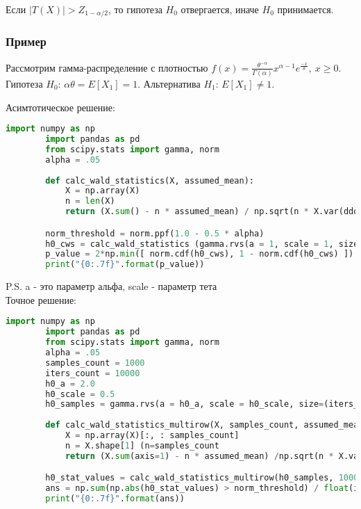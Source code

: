 Если $|T(X)| > Z_{1-\alpha/2}$, то гипотеза $H_0$ отвергается, иначе $H_0$ принимается.

\subsubsection*{Пример}\label{cha:1sample/sec:gamma/subsec:vald/subsubsec:python}

\begin{problem}
	 Рассмотрим гамма-распределение с плотностью $f(x) = \frac{\theta^{-\alpha}}{\Gamma(\alpha)} x^{\alpha-1} e^ {\frac{-x}{\theta}}, \ x \ge 0.$ Гипотеза $H_0$: $\alpha \theta = E[X_1] = 1$. Альтернатива $H_1$: $E[X_1] \neq 1$.
\end{problem}
\begin{solution}
	Асимтотическое решение:
	\begin{lstlisting}[language=Python]
		import numpy as np
		import pandas as pd
		from scipy.stats import gamma, norm
		alpha = .05
		
		def calc_wald_statistics(X, assumed_mean): 
	    	X = np.array(X)
	    	n = len(X)
	    	return (X.sum() - n * assumed_mean) / np.sqrt(n * X.var(ddof=1))

		norm_threshold = norm.ppf(1.0 - 0.5 * alpha)
		h0_cws = calc_wald_statistics (gamma.rvs(a = 1, scale = 1, size=2000), 1)
		p_value = 2*np.min([ norm.cdf(h0_cws), 1 - norm.cdf(h0_cws) ])
		print("{0:.7f}".format(p_value))
	\end{lstlisting}
	P.S. a - это параметр альфа, scale - параметр тета\\

	Точное решение:
	\begin{lstlisting}[language=Python]
		import numpy as np
		import pandas as pd
		from scipy.stats import gamma, norm
		alpha = .05
		samples_count = 1000 
		iters_count = 10000
		h0_a = 2.0
		h0_scale = 0.5
		h0_samples = gamma.rvs(a = h0_a, scale = h0_scale, size=(iters_count, samples_count))
		
		def calc_wald_statistics_multirow(X, samples_count, assumed_mean): 
		    X = np.array(X)[:, : samples_count]
		    n = X.shape[1] (n=samples_count
		    return (X.sum(axis=1) - n * assumed_mean) /np.sqrt(n * X.var(ddof=1, axis=1)) 

		h0_stat_values = calc_wald_statistics_multirow(h0_samples, 1000, h0_a * h0_scale)
		ans = np.sum(np.abs(h0_stat_values) > norm_threshold) / float(iters_count)
		print("{0:.7f}".format(ans))
	\end{lstlisting}
\end{solution}

